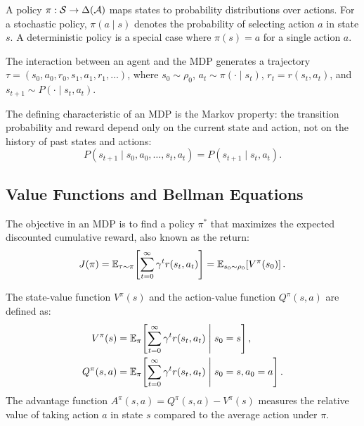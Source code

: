A policy $\pi: \mathcal{S} \to \Delta(\mathcal{A})$ maps states to probability distributions over actions. For a stochastic policy, $\pi(a \mid s)$ denotes the probability of selecting action $a$ in state $s$. A deterministic policy is a special case where $\pi(s) = a$ for a single action $a$.

The interaction between an agent and the MDP generates a trajectory $\tau = (s_0, a_0, r_0, s_1, a_1, r_1, \ldots)$, where $s_0 \sim \rho_0$, $a_t \sim \pi(\cdot \mid s_t)$, $r_t = r(s_t, a_t)$, and $s_{t+1} \sim P(\cdot \mid s_t, a_t)$.

\begin{definition}
The defining characteristic of an MDP is the Markov property: the transition probability and reward depend only on the current state and action, not on the history of past states and actions:
\begin{equation}
    P(s_{t+1} \mid s_0, a_0, \ldots, s_t, a_t) = P(s_{t+1} \mid s_t, a_t).
\end{equation}
\end{definition}

\subsection{Value Functions and Bellman Equations}

The objective in an MDP is to find a policy $\pi^*$ that maximizes the expected discounted cumulative reward, also known as the return:
\begin{equation}
    J(\pi) = \mathbb{E}_{\tau \sim \pi}\!\left[\sum_{t=0}^{\infty} \gamma^t r(s_t, a_t)\right] = \mathbb{E}_{s_0 \sim \rho_0}\!\left[V^{\pi}(s_0)\right].
    \label{eq:objective}
\end{equation}

\begin{definition}
The state-value function $V^{\pi}(s)$ and the action-value function $Q^{\pi}(s, a)$ are defined as:
\begin{align}
    V^{\pi}(s) &= \mathbb{E}_{\pi}\!\left[\sum_{t=0}^{\infty} \gamma^t r(s_t, a_t) \;\middle|\; s_0 = s\right], \label{eq:vfunc} \\
    Q^{\pi}(s, a) &= \mathbb{E}_{\pi}\!\left[\sum_{t=0}^{\infty} \gamma^t r(s_t, a_t) \;\middle|\; s_0 = s, a_0 = a\right]. \label{eq:qfunc}
\end{align}
The advantage function $A^{\pi}(s, a) = Q^{\pi}(s, a) - V^{\pi}(s)$ measures the relative value of taking action $a$ in state $s$ compared to the average action under $\pi$.
\end{definition}

